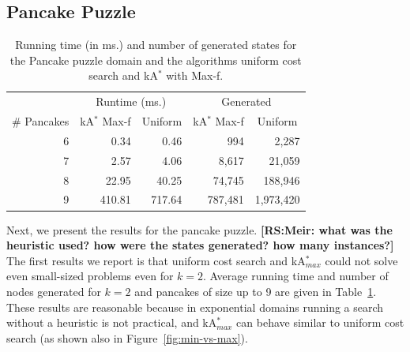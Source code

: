\documentclass{aicom2e}
\newcommand{\kastar}{kA$^*$}
\newcommand{\kastarmax}{kA$^*_{max}$}
\newcommand{\maxf}{Max-f}
\newcommand{\roni}[1]{\textbf{[RS:#1]}}
\begin{document}
\subsection{Pancake Puzzle}

\begin{table}[]
	\centering
	\begin{tabular}{r|rr|rr}
		\multicolumn{1}{l|}{}            & \multicolumn{2}{c|}{Runtime (ms.)}                                       & \multicolumn{2}{c}{Generated}                                           \\
		\multicolumn{1}{c|}{\# Pancakes} & \multicolumn{1}{c}{\kastar{} \maxf{}} & \multicolumn{1}{c|}{Uniform} & \multicolumn{1}{c}{\kastar{} \maxf{}} & \multicolumn{1}{c}{Uniform} \\ \hline
		6                               & 0.34                                      & 0.46                        & 994                                       & 2,287                       \\
		7                               & 2.57                                      & 4.06                        & 8,617                                     & 21,059                      \\
		8                               & 22.95                                     & 40.25                       & 74,745                                    & 188,946                     \\
		9                               & 410.81                                    & 717.64                      & 787,481                                   & 1,973,420                  
	\end{tabular}
	\caption{Running time (in ms.) and number of generated states for the Pancake puzzle domain and the algorithms uniform cost search and \kastar{} with \maxf{}.}
\label{tab:pancake-max-uniform}
\end{table}

Next, we present the results for the pancake puzzle. 
\roni{Meir: what was the heuristic used? how were the states generated? how many instances?}
The first results we report is that uniform cost search and \kastarmax{} 
could not solve even small-sized problems even for $k=2$. Average running time and number of nodes generated  for $k=2$ and pancakes of size up to 9 are given in Table~\ref{tab:pancake-max-uniform}. These results are reasonable because in exponential domains running a search without a heuristic is not practical, and \kastarmax{} can behave similar to uniform cost search (as shown also in Figure~\ref{fig:min-vs-max}). 
\end{document}
